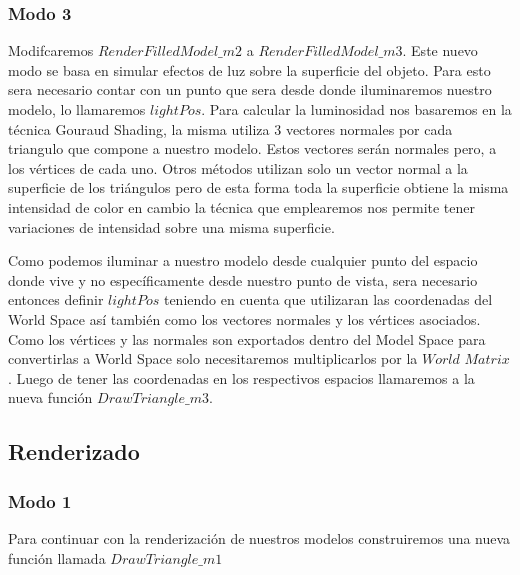 \documentclass[a4paper]{article}
\newcounter{col}
\begin{document}
\subsubsection{Modo 3}  

Modifcaremos $RenderFilledModel\_m2$ a $RenderFilledModel\_m3$. Este nuevo modo se basa en simular efectos de luz sobre la superficie del objeto. Para esto sera necesario contar con un punto que sera desde donde iluminaremos nuestro modelo, lo llamaremos $lightPos$. Para calcular la luminosidad nos basaremos en la técnica Gouraud Shading, la misma utiliza 3 vectores normales por cada triangulo que compone a nuestro modelo. Estos vectores serán normales pero, a los vértices de cada uno. Otros métodos utilizan solo un vector normal a la superficie de los triángulos pero de esta forma toda la superficie obtiene la misma intensidad de color en cambio la técnica que emplearemos nos permite tener variaciones de intensidad sobre una misma superficie. 
\par Como podemos iluminar a nuestro modelo desde cualquier punto del espacio donde vive y no específicamente desde nuestro punto de vista, sera necesario entonces definir $lightPos$ teniendo en cuenta que utilizaran las coordenadas del World Space así también como los vectores normales y los vértices asociados. Como los vértices y las normales son exportados dentro del Model Space para convertirlas a World Space solo necesitaremos multiplicarlos por la $World$ $Matrix$.  Luego de tener las coordenadas en los respectivos espacios llamaremos a la nueva función $DrawTriangle\_m3$.


\subsection{Renderizado}
\subsubsection{Modo 1} \label{sdlmodo1}


Para continuar con la renderización de nuestros modelos construiremos una nueva función llamada $DrawTriangle\_m1$ \\
\end{document}
